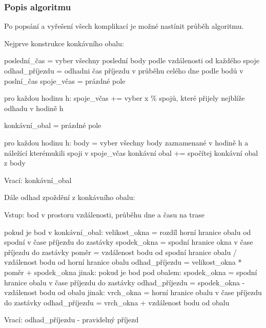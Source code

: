 \subsubsection{Popis algoritmu}

Po popsání a vyřešení všech komplikací je možné nastínit průběh algoritmu.

\bigbreak

Nejprve konstrukce konkávního obalu:

\begin{code}[frame=none]
poslední_čas = vyber všechny poslední body podle vzdálenosti od každého spoje
odhad_příjezdu = odhadni čas příjezdu v průběhu celého dne podle bodů v poslní_čas
spoje_včas = prázdné pole

pro každou hodinu h:
    spoje_včas += vyber x \% spojů, které přijely nejblíže odhadu v hodině h

konkávní_obal = prázdné pole

pro každou hodinu h:
    body = vyber všechny body zaznamenané v hodině h a náležící kterémukili spoji v spoje_včas
    konkávní obal += spočítej konkávní obal z body

Vrací: konkávní_obal
\end{code}

Dále odhad zpoždění z konkávního obalu:

\begin{code}[frame=none]
Vstup: bod v prostoru vzdálenosti, průběhu dne a času na trase

pokud je bod v konkávní_obal:
    velikost_okna = rozdíl horní hranice obalu od spodní v čase příjezdu do zastávky
    spodek_okna = spodní hranice okna v čase příjezdu do zastávky
    poměr = vzdálenost bodu od spodní hranice obalu / vzdálenost bodu od horní hranice obalu
    odhad_příjezdu = velikost_okna * poměr + spodek_okna
jinak:
    pokud je bod pod obalem:
        spodek_okna = spodní hranice obalu v čase příjezdu do zastávky
        odhad_příjezdu = spodek_okna - vzdálenost bodu od obalu
    jinak:
        vrch_okna = horní hranice obalu v čase příjezdu do zastávky
        odhad_příjezdu = vrch_okna + vzdálenost bodu od obalu

Vrací: odhad_příjezdu - pravidelný příjezd
\end{code}
